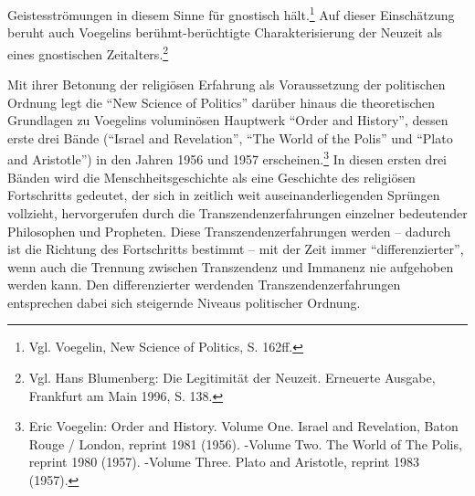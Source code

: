 \documentclass[12pt,a4paper,ngerman]{article}
\begin{document}
Geistesströmungen in diesem Sinne für gnostisch hält.\footnote{Vgl. Voegelin,
  New Science of Politics, S.  162ff.} Auf dieser Einschätzung beruht auch
Voegelins berühmt-berüchtigte Charakterisierung der Neuzeit als eines
gnostischen Zeitalters.\footnote{Vgl.  Hans Blumenberg: Die Legitimität der
  Neuzeit. Erneuerte Ausgabe, Frankfurt am Main 1996, S. 138.}

Mit ihrer Betonung der religiösen Erfahrung als Voraussetzung der politischen
Ordnung legt die "`New Science of Politics"' darüber hinaus die theoretischen
Grundlagen zu Voegelins voluminösen Hauptwerk "`Order and History"', dessen
erste drei Bände ("`Israel and Revelation"', "`The World of the Polis"' und
"`Plato and Aristotle"') in den Jahren 1956 und 1957 erscheinen.\footnote{Eric
  Voegelin: Order and History. Volume One. Israel and Revelation, Baton Rouge
  / London, reprint 1981 (1956). -Volume Two. The World of The Polis, reprint
  1980 (1957). -Volume Three.  Plato and Aristotle, reprint 1983 (1957).} In
diesen ersten drei Bänden wird die Menschheitsgeschichte als eine Geschichte
des religiösen Fortschritts gedeutet, der sich in zeitlich weit
auseinanderliegenden Sprüngen vollzieht, hervorgerufen durch die
Transzendenzerfahrungen einzelner bedeutender Philosophen und Propheten. Diese
Transzendenzerfahrungen werden -- dadurch ist die Richtung des Fortschritts
bestimmt -- mit der Zeit immer "`differenzierter"', wenn auch die Trennung
zwischen Transzendenz und Immanenz nie aufgehoben werden kann. Den
differenzierter werdenden Transzendenzerfahrungen entsprechen dabei sich
steigernde Niveaus politischer Ordnung.
\end{document}
